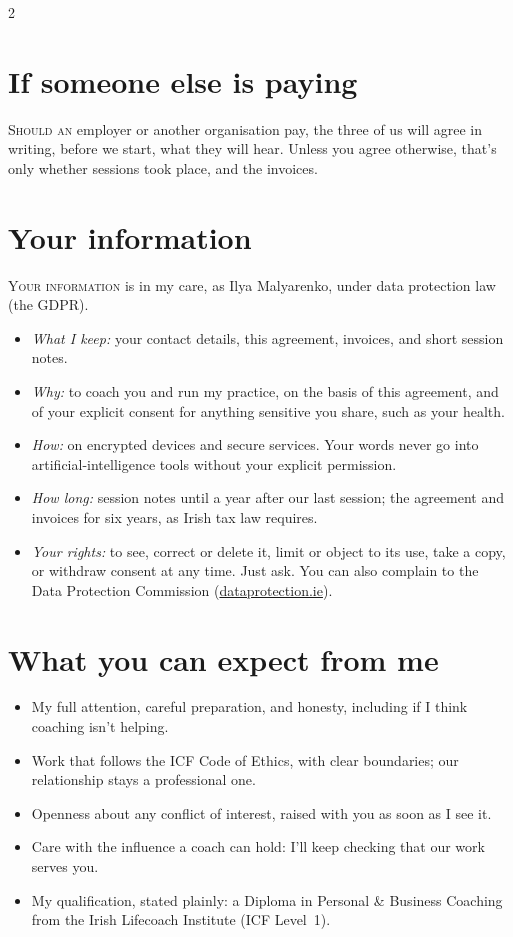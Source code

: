 \documentclass[9pt]{extarticle}
\newcommand{\initial}[2]{\lettrine[lines=2, loversize=.08, lraise=.02]{#1}{#2}}
\begin{document}
\newpage
\begin{multicols}{2}
\raggedcolumns

\section{If someone else is paying}
\initial{S}{hould an} employer or another organisation pay, the three of us will agree in writing, before we start, what they will hear. Unless you agree otherwise, that's only whether sessions took place, and the invoices.

\section{Your information}
\initial{Y}{our information} is in my care, as Ilya Malyarenko, under data protection law (the GDPR).
\begin{itemize}
  \item \emph{What I keep:} your contact details, this agreement, invoices, and short session notes.
  \item \emph{Why:} to coach you and run my practice, on the basis of this agreement, and of your explicit consent for anything sensitive you share, such as your health.
  \item \emph{How:} on encrypted devices and secure services. Your words never go into artificial-intelligence tools without your explicit permission.
  \item \emph{How long:} session notes until a year after our last session; the agreement and invoices for six years, as Irish tax law requires.
  \item \emph{Your rights:} to see, correct or delete it, limit or object to its use, take a copy, or withdraw consent at any time. Just ask. You can also complain to the Data Protection Commission (\href{https://www.dataprotection.ie}{\color{goldlight}dataprotection.ie}).
\end{itemize}

\section{What you can expect from me}
\begin{itemize}
  \item My full attention, careful preparation, and honesty, including if I think coaching isn't helping.
  \item Work that follows the ICF Code of Ethics, with clear boundaries; our relationship stays a professional one.
  \item Openness about any conflict of interest, raised with you as soon as I see it.
  \item Care with the influence a coach can hold: I'll keep checking that our work serves you.
  \item My qualification, stated plainly: a Diploma in Personal \& Business Coaching from the Irish Lifecoach Institute (ICF Level~1).
\end{itemize}


\end{multicols}
\end{document}
